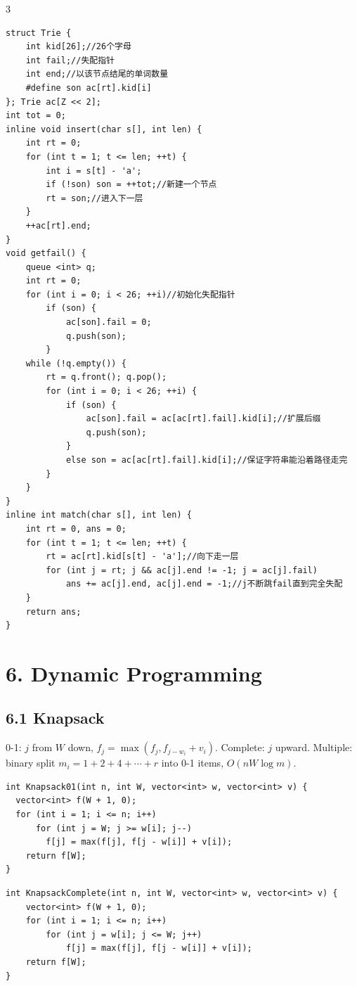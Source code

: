 \documentclass[8pt]{extarticle}
\begin{document}
\begin{multicols*}{3}
\begin{lstlisting}
struct Trie {
    int kid[26];//26个字母
    int fail;//失配指针
    int end;//以该节点结尾的单词数量
    #define son ac[rt].kid[i]
}; Trie ac[Z << 2];
int tot = 0;
inline void insert(char s[], int len) {
    int rt = 0;
    for (int t = 1; t <= len; ++t) {
        int i = s[t] - 'a';
        if (!son) son = ++tot;//新建一个节点
        rt = son;//进入下一层
    }
    ++ac[rt].end;
}
void getfail() {
    queue <int> q;
    int rt = 0;
    for (int i = 0; i < 26; ++i)//初始化失配指针
        if (son) {
            ac[son].fail = 0;
            q.push(son);
        }
    while (!q.empty()) {
        rt = q.front(); q.pop();
        for (int i = 0; i < 26; ++i) {
            if (son) {
                ac[son].fail = ac[ac[rt].fail].kid[i];//扩展后缀
                q.push(son);
            }
            else son = ac[ac[rt].fail].kid[i];//保证字符串能沿着路径走完
        }
    }
}
inline int match(char s[], int len) {
    int rt = 0, ans = 0;
    for (int t = 1; t <= len; ++t) {
        rt = ac[rt].kid[s[t] - 'a'];//向下走一层
        for (int j = rt; j && ac[j].end != -1; j = ac[j].fail)
            ans += ac[j].end, ac[j].end = -1;//j不断跳fail直到完全失配
    }
    return ans;
}
\end{lstlisting}

\section*{6. Dynamic Programming}

\subsection*{6.1 Knapsack}

0-1: $j$ from $W$ down, $f_j = \max(f_j, f_{j-w_i} + v_i)$. Complete: $j$ upward. Multiple: binary split $m_i = 1 + 2 + 4 + \cdots + r$ into 0-1 items, $O(nW \log m)$.


\begin{lstlisting}
int Knapsack01(int n, int W, vector<int> w, vector<int> v) {
  vector<int> f(W + 1, 0);
  for (int i = 1; i <= n; i++)
      for (int j = W; j >= w[i]; j--)
        f[j] = max(f[j], f[j - w[i]] + v[i]);
    return f[W];
}
\end{lstlisting}

\begin{lstlisting}
int KnapsackComplete(int n, int W, vector<int> w, vector<int> v) {
    vector<int> f(W + 1, 0);
    for (int i = 1; i <= n; i++)
        for (int j = w[i]; j <= W; j++)
            f[j] = max(f[j], f[j - w[i]] + v[i]);
    return f[W];
}
\end{lstlisting}


\end{multicols*}
\end{document}
